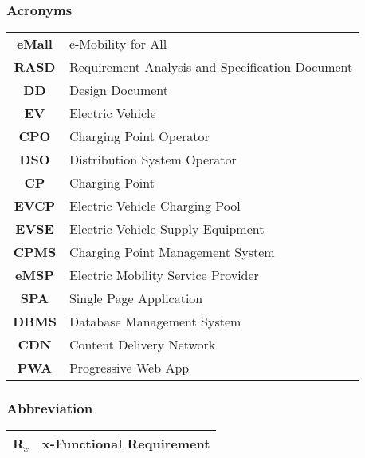 \subsubsection{Acronyms}
\begin{table}[H]
    \begin{tabularx}{\textwidth}{cX}
        \toprule
        \textbf{eMall} & e-Mobility for All                              \\
        \textbf{RASD}  & Requirement Analysis and Specification Document \\
        \textbf{DD}    & Design Document                                 \\
        \textbf{EV}    & Electric Vehicle                                \\
        \textbf{CPO}   & Charging Point Operator                         \\
        \textbf{DSO}   & Distribution System Operator                    \\
        \textbf{CP}    & Charging Point                                  \\
        \textbf{EVCP}  & Electric Vehicle Charging Pool                  \\
        \textbf{EVSE}  & Electric Vehicle Supply Equipment               \\
        \textbf{CPMS}  & Charging Point Management System                \\
        \textbf{eMSP}  & Electric Mobility Service Provider              \\
        \textbf{SPA}   & Single Page Application                         \\
        \textbf{DBMS}  & Database Management System                      \\
        \textbf{CDN}   & Content Delivery Network                        \\
        \textbf{PWA}   & Progressive Web App                             \\
        \bottomrule
    \end{tabularx}
\end{table}
\vspace*{1cm}
\subsubsection{Abbreviation}
\begin{table}[H]
    \begin{tabularx}{\textwidth}{cX}
        \toprule
        \textbf{R$_x$} & x-Functional Requirement \\
        \bottomrule
    \end{tabularx}
\end{table}
